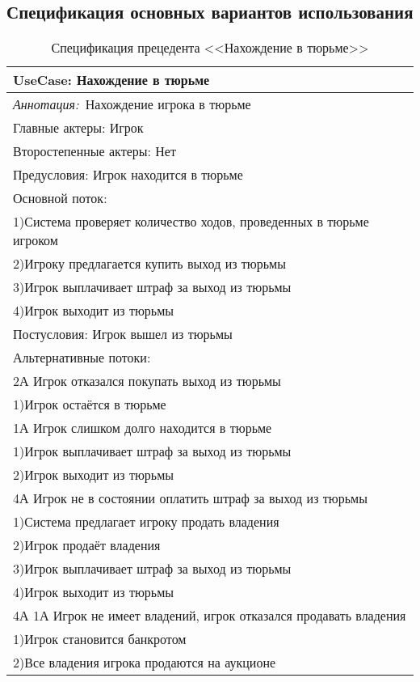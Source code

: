 \begin{Large}
\subsection{Спецификация основных вариантов использования}
\newpage
\begin{table}[h!]
\caption{Спецификация прецедента <<Нахождение в тюрьме>>}
\begin{tabular}{|l|}
    \hline
    \textbf{UseCase: Нахождение в тюрьме}\\
    \hline
    \textit{Аннотация:}\ Нахождение игрока в тюрьме\\
    \hline
    Главные актеры: Игрок \\
    \hline
    Второстепенные актеры: Нет \\
    \hline
    Предусловия: Игрок находится в тюрьме \\
    \hline
    Основной поток: \\
        1)Система проверяет количество ходов, проведенных в тюрьме игроком \\
        2)Игроку предлагается купить выход из тюрьмы \\
        3)Игрок выплачивает штраф за выход из тюрьмы \\
        4)Игрок выходит из тюрьмы \\
    \hline
    Постусловия: Игрок вышел из тюрьмы\\
    \hline
    Альтернативные потоки:\\
    2А Игрок отказался покупать выход из тюрьмы\\
    1)Игрок остаётся в тюрьме\\
    1А Игрок слишком долго находится в тюрьме\\
    1)Игрок выплачивает штраф за выход из тюрьмы\\
    2)Игрок выходит из тюрьмы\\
    4А Игрок не в состоянии оплатить штраф за выход из тюрьмы\\
    1)Система предлагает игроку продать владения\\
    2)Игрок продаёт владения\\
    3)Игрок выплачивает штраф за выход из тюрьмы\\
    4)Игрок выходит из тюрьмы\\
    4А 1А Игрок не имеет владений, игрок отказался продавать владения\\
    1)Игрок становится банкротом\\
    2)Все владения игрока продаются на аукционе\\

\end{tabular}
\end{table}
\end{Large}
